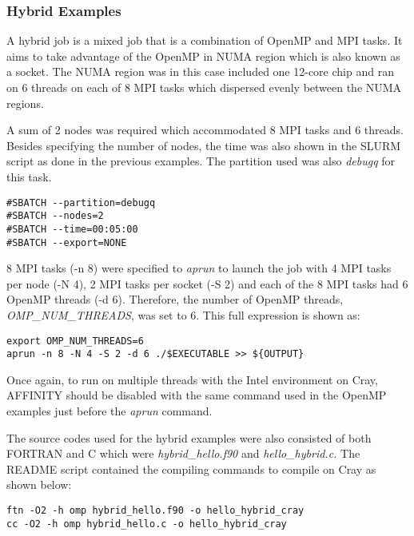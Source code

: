 \subsubsection{Hybrid Examples}

A hybrid job is a mixed job that is a combination of OpenMP and MPI tasks. It aims to take advantage of the OpenMP in NUMA region which is also known as 
a socket. The NUMA region was in this case included one 12-core chip and ran on 6 threads on each of 8 MPI tasks which dispersed evenly between 
the NUMA regions.

A sum of 2 nodes was required which accommodated 8 MPI tasks and 6 threads. Besides specifying the number of nodes, the time was also shown in the SLURM 
script as done in the previous examples. The partition used was also \emph{debugq} for this task.

\begin{tcolorbox}
\begin{Verbatim}[fontsize=\scriptsize]
#SBATCH --partition=debugq
#SBATCH --nodes=2
#SBATCH --time=00:05:00
#SBATCH --export=NONE
\end{Verbatim}
\end{tcolorbox}


8 MPI tasks (-n 8) were specified to \emph{aprun} to launch the job with 4 MPI tasks per node (-N 4), 2 MPI tasks per socket (-S 2) and each of the 8 MPI tasks 
had 6 OpenMP threads (-d 6). Therefore, the number of OpenMP threads, \emph{OMP\_NUM\_THREADS}, was set to 6. This full expression is shown as:

\begin{tcolorbox}
\begin{Verbatim}[fontsize=\scriptsize]
export OMP_NUM_THREADS=6
aprun -n 8 -N 4 -S 2 -d 6 ./$EXECUTABLE >> ${OUTPUT}
\end{Verbatim}
\end{tcolorbox}

Once again, to run on multiple threads with the Intel environment on Cray, AFFINITY should be disabled with the same command used in the OpenMP examples
just before the \emph{aprun} command.

The source codes used for the hybrid examples were also consisted of both FORTRAN and C which were \emph{hybrid\_hello.f90} and \emph{hello\_hybrid.c.} 
The README script contained the compiling commands to compile on Cray as shown below:

\begin{tcolorbox}
\begin{Verbatim}[fontsize=\scriptsize]
ftn -O2 -h omp hybrid_hello.f90 -o hello_hybrid_cray
cc -O2 -h omp hybrid_hello.c -o hello_hybrid_cray
\end{Verbatim}
\end{tcolorbox}

